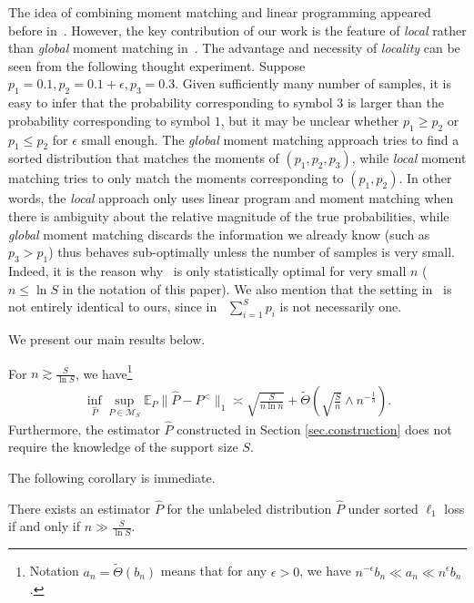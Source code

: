 \documentclass[final,12pt]{colt2018} %
\def \bE {\mathbb{E}}
\def \cM {\mathcal{M}}
\begin{document}
The idea of combining moment matching and linear programming appeared before in~\cite{kong2017spectrum,tian2017learning}. However, the key contribution of our work is the feature of \emph{local} rather than \emph{global} moment matching in~\cite{kong2017spectrum,tian2017learning}. The advantage and necessity of \emph{locality} can be seen from the following thought experiment. Suppose $p_1 = 0.1, p_2 = 0.1 + \epsilon, p_3 = 0.3$. Given sufficiently many number of samples, it is easy to infer that the probability corresponding to symbol $3$ is larger than the probability corresponding to symbol $1$, but it may be unclear whether $p_1 \geq  p_2$ or $p_1 \leq p_2$ for $\epsilon$ small enough. The \emph{global} moment matching approach tries to find a sorted distribution that matches the moments of $(p_1,p_2,p_3)$, while \emph{local} moment matching tries to only match the moments corresponding to $(p_1,p_2)$. In other words, the \emph{local} approach only uses linear program and moment matching when there is ambiguity about the relative magnitude of the true probabilities, while \emph{global} moment matching discards the information we already know (such as $p_3 > p_1$) thus behaves sub-optimally unless the number of samples is very small. Indeed, it is the reason why~\cite{tian2017learning} is only statistically optimal for very small $n$ ($n\leq \ln S$ in the notation of this paper). We also mention that the setting in~\cite{tian2017learning} is not entirely identical to ours, since in~\cite{tian2017learning} $\sum_{i = 1}^S p_i$ is not necessarily one. 

We present our main results below. 
\begin{theorem}\label{thm.main}
	For $n\gtrsim \frac{S}{\ln S}$, we have\footnote{Notation $a_n=\tilde{\Theta}(b_n)$ means that for any $\epsilon>0$, we have $n^{-\epsilon}b_n\ll a_n\ll n^{\epsilon}b_n$.}
	\begin{align*}
	\inf_{\hat{P}}\sup_{P\in\cM_S} \bE_P \lVert \hat{P}-P^<\rVert_1 \asymp \sqrt{\frac{S}{n\ln n}} + \tilde{\Theta}\left(\sqrt{\frac{S}{n}}\wedge n^{-\frac{1}{3}}\right).
	\end{align*}
	Furthermore, the estimator $\hat{P}$ constructed in Section \ref{sec.construction} does not require the knowledge of the support size $S$. 
\end{theorem}

The following corollary is immediate.
\begin{corollary}\label{cor.sample_complexity}
	There exists an estimator $\hat{P}$ for the unlabeled distribution $\hat{P}$ under sorted $\ell_1$ loss if and only if $n\gg \frac{S}{\ln S}$.
\end{corollary}
\end{document}
